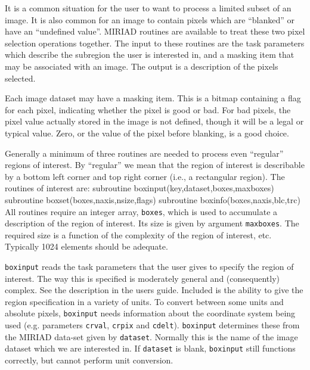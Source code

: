 
It is a common situation for the user to want to process a limited subset
of an image. It is also common for an image to contain pixels which are
``blanked'' or have an ``undefined value''. MIRIAD routines are available to
treat these two pixel selection operations together. The input to these
routines are the task parameters which describe the subregion the user
is interested in, and a masking item that may be associated with an image.
The output is a description of the pixels selected.

Each image dataset may have a masking item. This
is a bitmap containing a flag for each pixel, indicating
whether the pixel is good or bad. For bad pixels, the pixel value actually
stored
in the image is not defined, though it will be a legal or typical value.
Zero, or the value of the pixel before blanking, is a good choice.


Generally a minimum of three routines are needed to process even ``regular''
regions of interest. By ``regular'' we mean that the region of interest is
describable by a bottom left corner and top right corner (i.e., a rectangular
region). The routines of interest are:
{\ninepoint\begintt
        subroutine boxinput(key,dataset,boxes,maxboxes)
        subroutine boxset(boxes,naxis,nsize,flags)
        subroutine boxinfo(boxes,naxis,blc,trc)
\endtt}
All routines require an integer array, {\tt boxes}, which is used to
accumulate a description of the region of interest. Its size is given
by argument {\tt maxboxes}. The required size is a function of the
complexity of the region of interest, etc. Typically 1024 elements
should be adequate.

{\tt boxinput} reads the task parameters that the user gives to
specify the region of interest. The way this is specified is moderately
general and (consequently) complex. See the description in the users guide.
Included is the ability to give the region specification in a variety of
units. To convert between some units and absolute pixels, {\tt boxinput}
needs information about the coordinate system being used (e.g.
parameters {\tt crval}, {\tt crpix} and {\tt cdelt}). {\tt boxinput} determines
these from the MIRIAD data-set given by {\tt dataset}. Normally this is the name
of the image dataset which we are interested in. If {\tt dataset} is
blank, {\tt boxinput} still functions correctly, but cannot perform unit
conversion.

